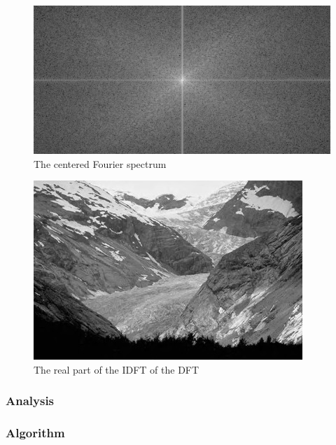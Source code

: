 \documentclass{article}
\begin{document}
\begin{figure}[H]
	\centering
	\includegraphics[width=384pt]{../result/fft-spectrum.png}
	\caption{The centered Fourier spectrum}
\end{figure}

\begin{figure}[H]
	\centering
	\includegraphics[width=288pt]{../result/fft-double.png}
	\caption{The real part of the IDFT of the DFT}
\end{figure}

\subsubsection{Analysis}

\paragraph{}


\subsubsection{Algorithm}
\end{document}
